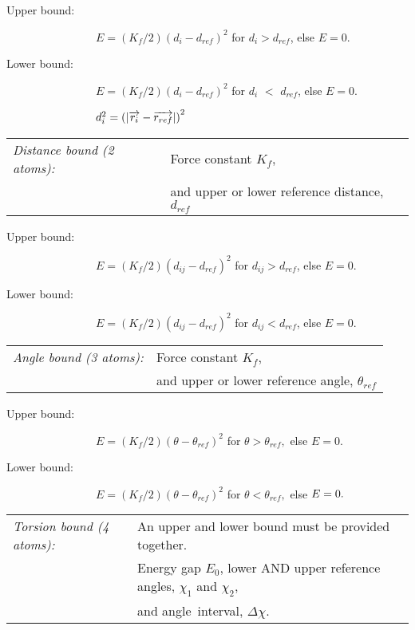 \qquad Upper bound:

$\qquad \qquad \qquad \qquad E=\left( K_{f}/2\right) \left(
d_{i}-d_{ref}\right) ^{2}$ for $d_{i}>d_{ref}$, else $E=0$.

\qquad Lower bound:

$\qquad \qquad \qquad \qquad E=\left( K_{f}/2\right) \left(
d_{i}-d_{ref}\right) ^{2}$ for $d_{i}$ $<$ $d_{ref}$, else $E=0$.\smallskip

$\qquad \qquad \qquad \qquad d_{i}^{2}=\left( \left| \overrightarrow{r_{i}}-%
\overrightarrow{r_{ref}}\right| \right) ^{2}\medskip \medskip $

\begin{tabular}{ll}
{\em Distance bound (2 atoms):} & Force constant $K_{f}$, \\ 
& and upper or lower reference distance, $d_{ref}$%
\end{tabular}

\qquad Upper bound:

$\qquad \qquad \qquad \qquad E=\left( K_{f}/2\right) \left(
d_{ij}-d_{ref}\right) ^{2}$ for $d_{ij}>d_{ref}$, else $E=0$.

\qquad Lower bound:

$\qquad \qquad \qquad \qquad E=\left( K_{f}/2\right) \left(
d_{ij}-d_{ref}\right) ^{2}$ for $d_{ij}<d_{ref}$, else $E=0$.\medskip
\medskip 

\begin{tabular}{ll}
{\em Angle bound (3 atoms):} & Force constant $K_{f}$, \\ 
& and upper or lower reference angle, $\theta _{ref}$%
\end{tabular}

\qquad Upper bound:

$\qquad \qquad \qquad \qquad E=\left( K_{f}/2\right) \left( \theta -\theta
_{ref}\right) ^{2}$ for $\theta >\theta _{ref},$ else $E=0$.

\qquad Lower bound:

$\qquad \qquad \qquad \qquad E=\left( K_{f}/2\right) \left( \theta -\theta
_{ref}\right) ^{2}$ for $\theta <\theta _{ref},$ else $E=0.\medskip \medskip
\medskip $

\begin{tabular}{ll}
{\em Torsion bound (4 atoms):} & An upper and lower bound must be provided
together. \\ 
& Energy gap $E_{0}$, lower AND upper reference angles, $\chi _{1}$ and $%
\chi _{2}$, \\ 
& and angle~interval, $\Delta \chi .$%
\end{tabular}


